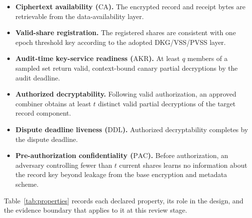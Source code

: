 \documentclass[10pt]{article}
\newcommand{\CA}{\mathrm{CA}}
\newcommand{\AKR}{\mathrm{AKR}}
\newcommand{\DDL}{\mathrm{DDL}}
\newcommand{\PAC}{\mathrm{PAC}}
\begin{document}
\begin{itemize}
  \item \textbf{Ciphertext availability ($\CA$).} The encrypted record and receipt bytes are retrievable from the data-availability layer.
  \item \textbf{Valid-share registration.} The registered shares are consistent with one epoch threshold key according to the adopted DKG/VSS/PVSS layer.
  \item \textbf{Audit-time key-service readiness ($\AKR$).} At least $q$ members of a sampled set return valid, context-bound canary partial decryptions by the audit deadline.
  \item \textbf{Authorized decryptability.} Following valid authorization, an approved combiner obtains at least $t$ distinct valid partial decryptions of the target record component.
  \item \textbf{Dispute deadline liveness ($\DDL$).} Authorized decryptability completes by the dispute deadline.
  \item \textbf{Pre-authorization confidentiality ($\PAC$).} Before authorization, an adversary controlling fewer than $t$ current shares learns no information about the record key beyond leakage from the base encryption and metadata scheme.
\end{itemize}

Table~\ref{tab:properties} records each declared property, its role in the design, and the evidence boundary that applies to it at this review stage.
\end{document}
